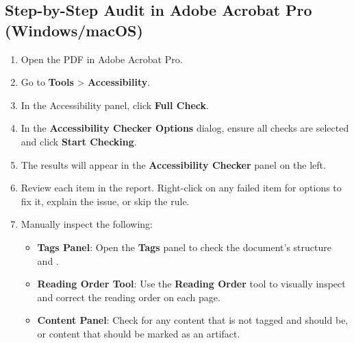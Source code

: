 \subsection{Step-by-Step Audit in Adobe Acrobat Pro (Windows/macOS)}
\label{subsec:audit-in-acrobat}
\begin{enumerate}
	\item Open the PDF in Adobe Acrobat Pro.
	\item Go to \textbf{Tools} > \textbf{Accessibility}.
	\item In the Accessibility panel, click \textbf{Full Check}.
	\item In the \textbf{Accessibility Checker Options} dialog, ensure all checks are selected and click \textbf{Start Checking}.
	\item The results will appear in the \textbf{Accessibility Checker} panel on the left.
	\item Review each item in the report. Right-click on any failed item for options to fix it, explain the issue, or skip the rule.
	\item Manually inspect the following:
	      \begin{itemize}
		      \item \textbf{Tags Panel}: Open the \textbf{Tags} panel to check the document's structure and .
		      \item \textbf{Reading Order Tool}: Use the \textbf{Reading Order} tool to visually inspect and correct the reading order on each page.
		      \item \textbf{Content Panel}: Check for any content that is not tagged and should be, or content that should be marked as an artifact.
	      \end{itemize}
\end{enumerate}

